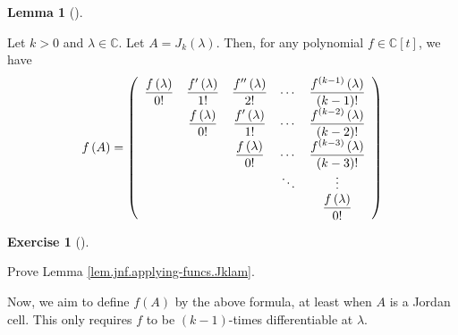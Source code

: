 \documentclass[numbers=enddot,12pt,final,onecolumn,notitlepage]{scrartcl}%
\newcounter{exer}
\numberwithin{exer}{subsection}
\theoremstyle{definition}
\newtheorem{lem}[theo]{Lemma}
\newenvironment{lemma}[1][]
{\begin{lem}[#1]\begin{leftbar}}
{\end{leftbar}\end{lem}}
\newtheorem{exmp}[exer]{Exercise}
\newenvironment{exercise}[1][]
{\begin{exmp}[#1]\begin{leftbar}}
{\end{leftbar}\end{exmp}}
\begin{document}
\begin{lemma}
\label{lem.jnf.applying-funcs.Jklam}Let $k>0$ and $\lambda\in\mathbb{C}$. Let
$A=J_{k}\left(  \lambda\right)  $. Then, for any polynomial $f\in
\mathbb{C}\left[  t\right]  $, we have%
\[
f\left(  A\right)  =\left(
\begin{array}
[c]{ccccc}%
\dfrac{f\left(  \lambda\right)  }{0!} & \dfrac{f^{\prime}\left(
\lambda\right)  }{1!} & \dfrac{f^{\prime\prime}\left(  \lambda\right)  }{2!} &
\cdots & \dfrac{f^{\left(  k-1\right)  }\left(  \lambda\right)  }{\left(
k-1\right)  !}\\
& \dfrac{f\left(  \lambda\right)  }{0!} & \dfrac{f^{\prime}\left(
\lambda\right)  }{1!} & \cdots & \dfrac{f^{\left(  k-2\right)  }\left(
\lambda\right)  }{\left(  k-2\right)  !}\\
&  & \dfrac{f\left(  \lambda\right)  }{0!} & \cdots & \dfrac{f^{\left(
k-3\right)  }\left(  \lambda\right)  }{\left(  k-3\right)  !}\\
&  &  & \ddots & \vdots\\
&  &  &  & \dfrac{f\left(  \lambda\right)  }{0!}%
\end{array}
\right)
\]

\end{lemma}

\begin{exercise}
 Prove Lemma \ref{lem.jnf.applying-funcs.Jklam}.
\end{exercise}

Now, we aim to define $f\left(  A\right)  $ by the above formula, at least
when $A$ is a Jordan cell. This only requires $f$ to be $\left(  k-1\right)
$-times differentiable at $\lambda$.
\end{document}

